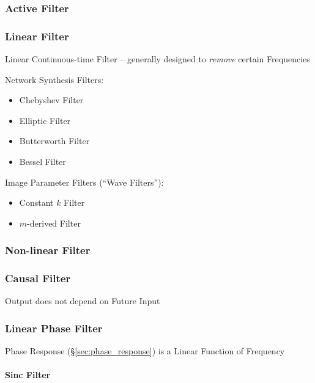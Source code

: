 \subsubsection{Active Filter}\label{sec:active_filter}

\subsubsection{Linear Filter}\label{sec:linear_filter}

Linear Continuous-time Filter -- generally designed to \emph{remove} certain
Frequencies

Network Synthesis Filters:
\begin{itemize}
  \item Chebyshev Filter
  \item Elliptic Filter
  \item Butterworth Filter
  \item Bessel Filter
\end{itemize}

Image Parameter Filters (``Wave Filters''):
\begin{itemize}
  \item Constant $k$ Filter
  \item $m$-derived Filter
\end{itemize}



\subsubsection{Non-linear Filter}\label{sec:nonlinear_filter}

\subsubsection{Causal Filter}\label{sec:causal_filter}

Output does not depend on Future Input



\subsubsection{Linear Phase Filter}\label{sec:linear_phase}

Phase Response (\S\ref{sec:phase_response}) is a Linear Function of Frequency



\paragraph{Sinc Filter}\label{sec:sinc_filter}\hfill

